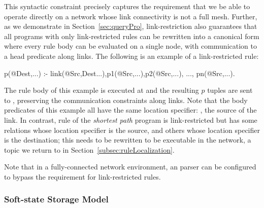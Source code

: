 This syntactic constraint precisely captures the requirement that we
be able to operate directly on a network whose link connectivity is
not a full mesh.  Further, as we demonstrate in
Section~\ref{sec:queryPro}, link-restriction also guarantees that all
programs with only link-restricted rules can be rewritten into a
canonical form where every rule body can be evaluated on a single
node, with communication to a head predicate along links. The following is an example of
a link-restricted rule:
\begin{NDlog}
p(@Dest,...) :- link(@Src,Dest...),p1(@Src,...),p2(@Src,...),
                ..., pn(@Src,...).
\end{NDlog}
The rule body of this example is executed at  and the resulting $p$
tuples are sent to , preserving the communication constraints along
links. Note that the body predicates of this example all have the same
location specifier: , the source of the link. In contrast, rule
 of the \emph{shortest path} program is link-restricted but has some
relations whose location specifier is the source, and others whose
location specifier is the destination; this needs to be rewritten
to be executable in the network, a topic we return to in
  Section~\ref{subsec:ruleLocalization}. 

Note that in a fully-connected network environment, an \Dlog parser can
be configured to bypass the requirement for link-restricted rules.







\subsubsection{Soft-state Storage Model}
\label{sec:dn:softstate}

